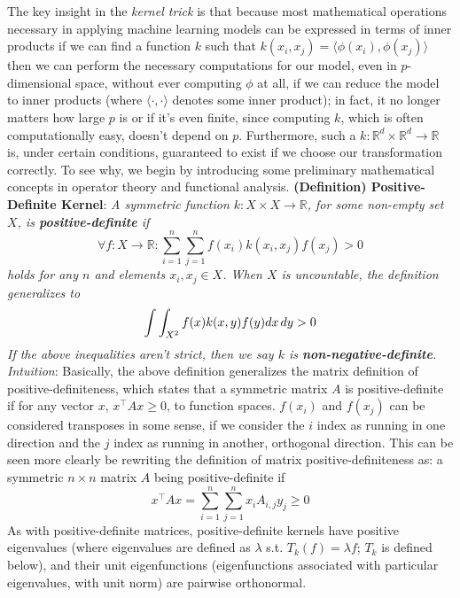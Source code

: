 \documentclass{article}
\begin{document}
\newline \newline
The key insight in the \textit{kernel trick} is that because most mathematical operations necessary in applying machine learning models can be expressed in terms of inner products if we can find a function $ k $ such that $ k(x_i, x_j) = \langle \phi(x_i), \phi(x_j) \rangle $ then we can perform the necessary computations for our model, even in $ p $-dimensional space, without ever computing $ \phi $ at all, if we can reduce the model to inner products (where $ \langle \cdot, \cdot \rangle $ denotes some inner product); in fact, it no longer matters how large $ p $ is or if it's even finite, since computing $ k $, which is often computationally easy, doesn't depend on $ p $. Furthermore, such a $ k: \mathbb{R}^d \times \mathbb{R}^d \rightarrow \mathbb{R} $ is, under certain conditions, guaranteed to exist if we choose our transformation correctly. To see why, we begin by introducing some preliminary mathematical concepts in operator theory and functional analysis.
\newline \newline
\textbf{(Definition) Positive-Definite Kernel}: \textit{A symmetric function $ k: X \times X \rightarrow \mathbb{R} $, for some non-empty set $ X $, is \textbf{positive-definite} if}
$$ \forall f: X \rightarrow \mathbb{R}: \sum_{i = 1}^n \sum_{j = 1}^n f(x_i) k(x_i, x_j) f(x_j) > 0 $$
\indent \textit{holds for any $ n $ and elements $ x_i, x_j \in X $. When $ X $ is uncountable, the definition generalizes to}
$$ \int \int_{X^2} f(x) k(x, y) f(y) dx \hspace{0.02in} dy > 0 $$
\indent \textit{If the above inequalities aren't strict, then we say $ k $ is \textbf{non-negative-definite}.}
\newline
\indent \textit{Intuition}: Basically, the above definition generalizes the matrix definition of positive-definiteness, which states that a symmetric matrix $ A $ is positive-definite if for any vector $ x $, $ x^\intercal A x \geq 0 $, to function spaces. $ f(x_i) $ and $ f(x_j) $ can be considered transposes in some sense, if we consider the $ i $ index as running in one direction and the $ j $ index as running in another, orthogonal direction. This can be seen more clearly be rewriting the definition of matrix positive-definiteness as: a symmetric $ n \times n $ matrix $ A $ being positive-definite if
$$ x^\intercal A x = \sum_{i = 1}^n \sum_{j = 1}^n x_i A_{i, j} y_j \geq 0 $$
As with positive-definite matrices, positive-definite kernels have positive eigenvalues (where eigenvalues are defined as $ \lambda $ s.t. $ T_k(f) = \lambda f $; $ T_k $ is defined below), and their unit eigenfunctions (eigenfunctions associated with particular eigenvalues, with unit norm) are pairwise orthonormal.
\end{document}
